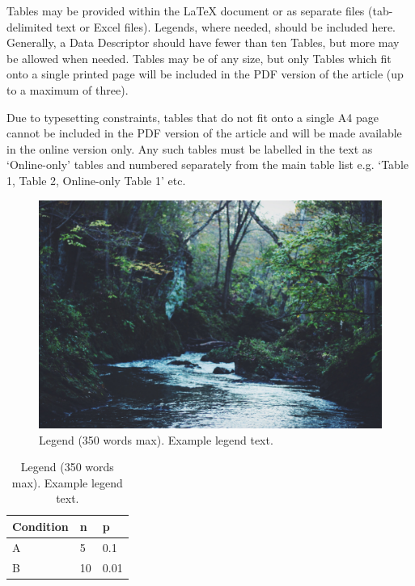 \documentclass[fleqn,10pt]{wlscirep}
\begin{document}
Tables may be provided within the \LaTeX{} document or as separate files (tab-delimited text or Excel files). Legends, where needed, should be included here. Generally, a Data Descriptor should have fewer than ten Tables, but more may be allowed when needed. Tables may be of any size, but only Tables which fit onto a single printed page will be included in the PDF version of the article (up to a maximum of three). 

Due to typesetting constraints, tables that do not fit onto a single A4 page cannot be included in the PDF version of the article and will be made available in the online version only. Any such tables must be labelled in the text as ‘Online-only’ tables and numbered separately from the main table list e.g. ‘Table 1, Table 2, Online-only Table 1’ etc.

\begin{figure}[ht]
\centering
\includegraphics[width=\linewidth]{stream}
\caption{Legend (350 words max). Example legend text.}
\label{fig:stream}
\end{figure}

\begin{table}[ht]
\centering
\begin{tabular}{|l|l|l|}
\hline
Condition & n & p \\
\hline
A & 5 & 0.1 \\
\hline
B & 10 & 0.01 \\
\hline
\end{tabular}
\caption{\label{tab:example}Legend (350 words max). Example legend text.}
\end{table}
\end{document}
